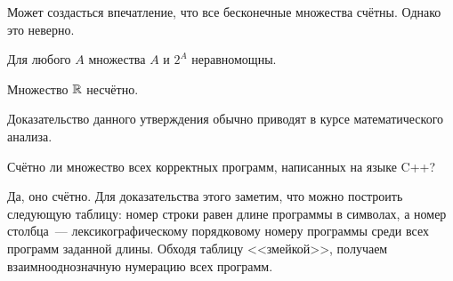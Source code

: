 Может создасться впечатление, что все бесконечные множества счётны.
Однако это неверно.

\begin{theorem}[Кантора]
    Для любого $ A $ множества $ A $ и $ 2^A $ неравномощны.
\end{theorem}

\begin{statement}
    Множество $ \mathbb{R} $ несчётно.
\end{statement}

Доказательство данного утверждения обычно приводят в курсе математического анализа.

\begin{Exercise}[counter=SecExercise]
    \noindent
    Счётно ли множество всех корректных программ, написанных на языке C++?
\end{Exercise}

\begin{Answer}
    \noindent
    Да, оно счётно.
    Для доказательства этого заметим, что можно построить следующую таблицу:
    номер строки равен длине программы в символах, а номер столбца~--- лексикографическому порядковому номеру программы среди всех программ заданной длины.
    Обходя таблицу <<змейкой>>, получаем взаимнооднозначную нумерацию всех программ.
\end{Answer}
\fi
